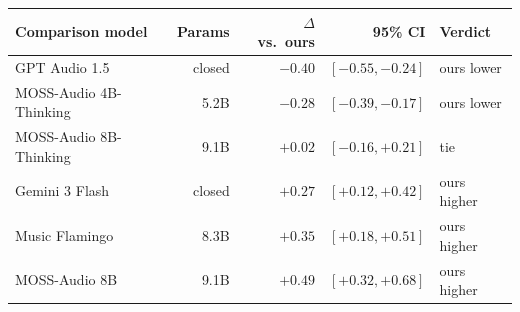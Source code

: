 \begin{tabular}{lrrrl}
\toprule
\textbf{Comparison model} & \textbf{Params} & \textbf{$\Delta$ vs.\ ours} & \textbf{95\% CI} & \textbf{Verdict} \\
\midrule
GPT Audio 1.5 & closed & $-0.40$ & $[-0.55, -0.24]$ & ours lower \\
MOSS-Audio 4B-Thinking & 5.2B & $-0.28$ & $[-0.39, -0.17]$ & ours lower \\
MOSS-Audio 8B-Thinking & 9.1B & $+0.02$ & $[-0.16, +0.21]$ & tie \\
Gemini 3 Flash & closed & $+0.27$ & $[+0.12, +0.42]$ & ours higher \\
Music Flamingo & 8.3B & $+0.35$ & $[+0.18, +0.51]$ & ours higher \\
MOSS-Audio 8B & 9.1B & $+0.49$ & $[+0.32, +0.68]$ & ours higher \\
\bottomrule
\end{tabular}
